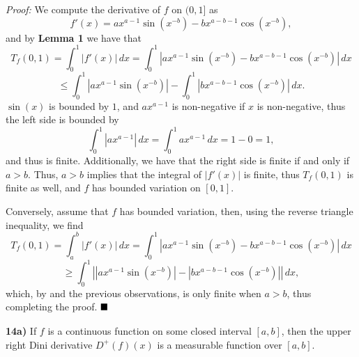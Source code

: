 \documentclass[12pt]{article}
\newcommand{\vertb}[1]{\left\vert#1\right\vert}
\newcommand{\proof}{\textit{Proof: }}
\newcommand{\done}{\ensuremath{\strut\hfill\blacksquare}}
\newcommand{\sectionskip}{\vspace{0.15in}}
\begin{document}
\proof
We compute the derivative of \( f \) on \( (0,1] \) as
\[
	f'(x) = ax^{a - 1}\sin(x^{-b}) - bx^{a - b - 1}\cos(x^{-b}),
\]
and by \textbf{Lemma 1} we have that
\[
	T_f(0,1) = \int_0^1 \vertb{f'(x)} \, dx
	= \int_0^1 \vertb{ax^{a - 1}\sin(x^{-b}) - bx^{a - b - 1}\cos(x^{-b})} \, dx
\]
\[
	\leq
	\int_0^1 \vertb{ax^{a - 1}\sin(x^{-b})}
	- \int_0^1 \vertb{bx^{a - b - 1}\cos(x^{-b})} \, dx.
\]
\( \sin(x) \) is bounded by \( 1 \), and \( ax^{a - 1} \) is non-negative if
\( x \) is non-negative, thus the left side is bounded by
\[
	\int_0^1 \vertb{ax^{a - 1}} \, dx
	= \int_0^1 ax^{a - 1} \, dx
	= 1 - 0 = 1,
\]
and thus is finite.
Additionally, we have that the right side is finite if and only if
\( a > b \).
\cite{Integrable}
Thus, \( a > b \) implies that the integral of \( \vertb{f'(x)} \) is finite,
thus \( T_f(0,1) \) is finite as well, and \( f \) has bounded variation on
\( [0,1] \).

Conversely, assume that \( f \) has bounded variation, then, using the reverse
triangle inequality, we find
\[
	T_f(0,1)
	= \int_a^b \vertb{f'(x)} \, dx
	= \int_0^1 \vertb{ax^{a - 1}\sin(x^{-b}) - bx^{a - b - 1}\cos(x^{-b})} \, dx
\]
\[
	\geq \int_0^1
	\vertb{
		\vertb{ax^{a - 1}\sin(x^{-b})} - \vertb{bx^{a - b - 1}\cos(x^{-b})}
	} \, dx,
\]
which, by \cite{Integrable} and the previous observations, is only finite when
\( a > b \), thus completing the proof.
\done

\sectionskip

\textbf{14a)}
If \( f \) is a continuous function on some closed interval \( [a,b] \),
then the upper right Dini derivative \( D^+(f)(x) \) is a measurable function
over \( [a,b] \).
\end{document}

